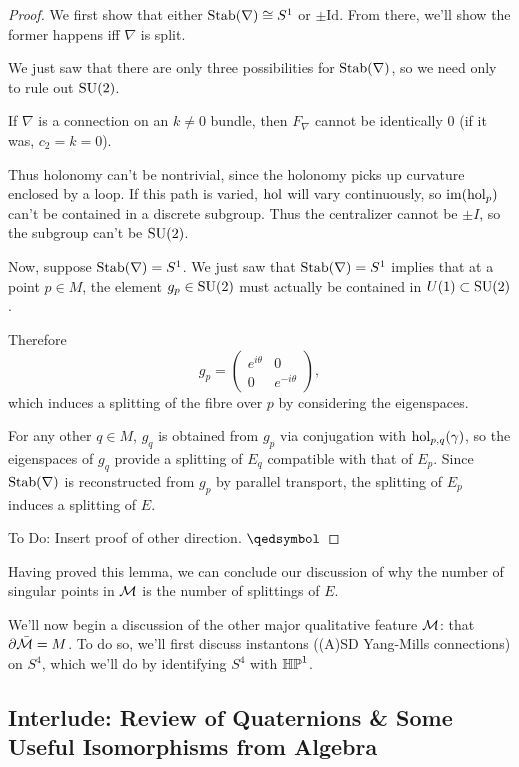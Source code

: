 \documentclass[main]{subfiles}
\begin{document}
\begin{proof}
We first show that either $\operatorname{Stab}(\nabla)\cong S^1$ or $\pm\mathrm{Id}$. From there, we'll show the former happens iff $\nabla$ is split.

We just saw that there are only three possibilities for $\operatorname{Stab}(\nabla)$, so we need only to rule out $\operatorname{SU}(2)$.

If $\nabla$ is a connection on an $k\neq 0$ bundle, then $F_\nabla$ cannot be identically $0$ (if it was, $c_2=k=0$).

Thus holonomy can't be nontrivial, since the holonomy picks up curvature enclosed by a loop. If this path is varied, $\operatorname{hol}$ will vary continuously, so $\operatorname{im}(\operatorname{hol}_p)$ can't be contained in a discrete subgroup. Thus the centralizer cannot be $\pm I$, so the subgroup can't be $\operatorname{SU}(2)$.

Now, suppose $\operatorname{Stab}(\nabla)=S^1$. We just saw that $\operatorname{Stab}(\nabla)=S^1$ implies that at a point $p\in M$, the element $g_p\in\operatorname{SU}(2)$ must actually be contained in $U(1)\subset\operatorname{SU}(2)$.

Therefore
\[
g_p = \begin{pmatrix} e^{i\theta} & 0 \\ 0 & e^{-i\theta}\end{pmatrix},
\]
which induces a splitting of the fibre over $p$ by considering the eigenspaces.

For any other $q\in M$, $g_q$ is obtained from $g_p$ via conjugation with $\operatorname{hol}_{p,q}(\gamma)$, so the eigenspaces of $g_q$ provide a splitting of $E_q$ compatible with that of $E_p$. Since $\operatorname{Stab}(\nabla)$ is reconstructed from $g_p$ by parallel transport, the splitting of $E_p$ induces a splitting of $E$.

To Do: Insert proof of other direction. $\qedsymbol$
\end{proof}

Having proved this lemma, we can conclude our discussion of why the number of singular points in $\mathcal{M}$ is the number of splittings of $E$.

We'll now begin a discussion of the other major qualitative feature $\mathcal{M}$: that $\partial\bar{\mathcal{M}} = M$. To do so, we'll first discuss instantons ((A)SD Yang-Mills connections) on $S^4$, which we'll do by identifying $S^4$ with $\mathbb{HP}^1$.

\subsection*{Interlude: Review of Quaternions \& Some Useful Isomorphisms from Algebra}
\end{document}
